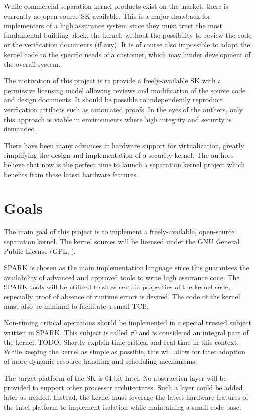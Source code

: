 While commercial separation kernel products exist on the market, there is
currently no open-source SK available. This is a major drawback for
implementers of a high assurance system since they must trust the most
fundamental building block, the kernel, without the possibility to review the
code or the verification documents (if any). It is of course also impossible to
adapt the kernel code to the specific needs of a customer, which may hinder
development of the overall system.

The motivation of this project is to provide a freely-available SK with a
permissive licensing model allowing reviews and modification of
the source code and design documents. It should be possible to independently
reproduce verification artifacts such as automated proofs. In the eyes of the
authors, only this approach is viable in environments where high integrity and
security is demanded.

There have been many advances in hardware support for virtualization, greatly
simplifying the design and implementation of a security kernel. The authors
believe that now is the perfect time to launch a separation kernel project
which benefits from these latest hardware features.

\section{Goals}
The main goal of this project is to implement a freely-available, open-source
separation kernel. The kernel sources will be licensed under the GNU General
Public License (GPL, \cite{gpl}).

SPARK is chosen as the main implementation language since this guarantees the
availability of advanced and approved tools to write high assurance code. The
SPARK tools will be utilized to show certain properties of the kernel code,
especially proof of absence of runtime errors is desired. The code of the kernel
must also be minimal to facilitate a small TCB.

Non-timing critical operations should be implemented in a special trusted
subject written in SPARK. This subject is called $\tau$0 and is considered an
integral part of the kernel. TODO: Shortly explain time-critical and real-time
in this context. While keeping the kernel as simple as possible, this will
allow for later adoption of more dynamic resource handling and scheduling
mechanisms.

The target platform of the SK is 64-bit Intel. No abstraction layer will be
provided to support other processor architectures. Such a layer could be added
later as needed. Instead, the kernel must leverage the latest hardware features
of the Intel platform to implement isolation while maintaining a small code
base.

